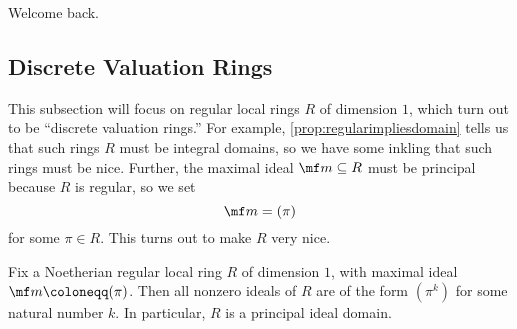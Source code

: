 \documentclass[../notes.tex]{subfiles}
\begin{document}

Welcome back.

\subsection{Discrete Valuation Rings}
This subsection will focus on regular local rings $R$ of dimension $1$, which turn out to be ``discrete valuation rings.'' For example, \autoref{prop:regularimpliesdomain} tells us that such rings $R$ must be integral domains, so we have some inkling that such rings must be nice. Further, the maximal ideal $\mf m\subseteq R$ must be principal because $R$ is regular, so we set
\[\mf m=(\pi)\]
for some $\pi\in R$. This turns out to make $R$ very nice.
\begin{proposition} \label{prop:altdvr}
	Fix a Noetherian regular local ring $R$ of dimension $1$, with maximal ideal $\mf m\coloneqq(\pi)$. Then all nonzero ideals of $R$ are of the form $\left(\pi^k\right)$ for some natural number $k$. In particular, $R$ is a principal ideal domain.
\end{proposition}
\end{document}
